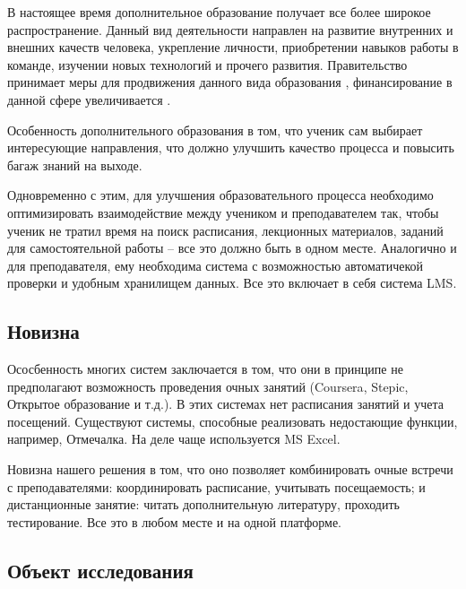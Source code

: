 \documentclass[a4paper,14pt]{article}
\begin{document}
В настоящее время дополнительное образование получает все более широкое распространение.
Данный вид деятельности направлен на развитие внутренних и внешних качеств человека, укрепление личности, приобретении навыков работы в команде, изучении новых технологий и прочего развития.
Правительство принимает меры для продвижения данного вида образования \cite{extraEdu}, финансирование в данной сфере увеличивается \cite{extraEduFin}.

Особенность дополнительного образования в том, что ученик сам выбирает интересующие направления, что должно улучшить качество процесса и повысить багаж знаний на выходе. 

Одновременно с этим, для улучшения образовательного процесса необходимо оптимизировать взаимодействие между учеником и преподавателем так, чтобы ученик не тратил время на поиск расписания, лекционных материалов, заданий для самостоятельной работы -- все это должно быть в одном месте. Аналогично и для преподавателя, ему необходима система с возможностью автоматичекой проверки и удобным хранилищем данных. Все это включает в себя система LMS. 
 
\subsection{Новизна}


Ососбенность многих систем заключается в том, что они в принципе не предполагают возможность проведения очных занятий (Coursera\cite{coursera}, Stepic\cite{stepic}, Открытое образование\cite{openEDU} и т.д.).
В этих системах нет расписания занятий и учета посещений.
Существуют системы, способные реализовать недостающие функции, например, Отмечалка\cite{otmechalka}.
На деле чаще используется MS Excel.

Новизна нашего решения в том, что оно позволяет комбинировать очные встречи с преподавателями: координировать расписание, учитывать посещаемость; и дистанционные занятие: читать дополнительную литературу, проходить тестирование. Все это в любом месте и на одной платформе.

\subsection{Объект исследования}
\end{document}
